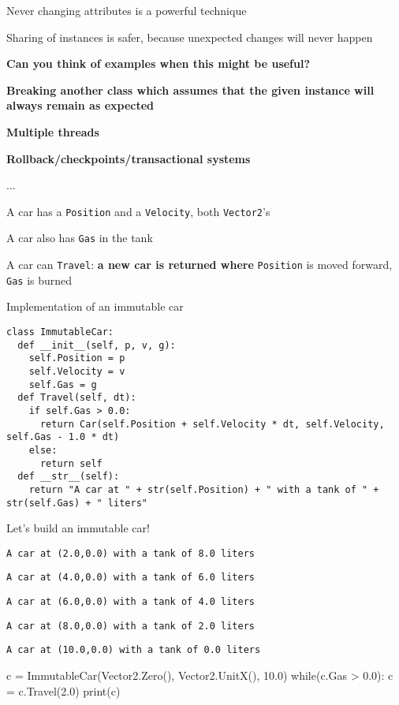 \documentclass{beamer}
\begin{document}
\begin{slide}{
\item Never changing attributes is a powerful technique
\item Sharing of instances is safer, because unexpected changes will never happen
\item \textbf{Can you think of examples when this might be useful?}
\pause
\item \textbf{Breaking another class which assumes that the given instance will always remain as expected}
\item \textbf{Multiple threads}
\item \textbf{Rollback/checkpoints/transactional systems}
\item ...
}\end{slide}

\begin{slide}{
\item A car has a \texttt{Position} and a \texttt{Velocity}, both \texttt{Vector2}'s
\item A car also has \texttt{Gas} in the tank
\item A car can \texttt{Travel}: \textbf{a new car is returned where} \texttt{Position} is moved forward, \texttt{Gas} is burned
}\end{slide}

\begin{frame}[fragile]{Implementation of an immutable car}
\begin{lstlisting}
class ImmutableCar:
  def __init__(self, p, v, g):
    self.Position = p
    self.Velocity = v
    self.Gas = g
  def Travel(self, dt):
    if self.Gas > 0.0:
      return Car(self.Position + self.Velocity * dt, self.Velocity, self.Gas - 1.0 * dt)
    else:
      return self
  def __str__(self):
    return "A car at " + str(self.Position) + " with a tank of " + str(self.Gas) + " liters"
\end{lstlisting}
\end{frame}

\begin{frame}[fragile]{Let's build an immutable car!}
\begin{codewithblock}{\pause \item \texttt{A car at (2.0,0.0) with a tank of 8.0 liters} \item \texttt{A car at (4.0,0.0) with a tank of 6.0 liters} \item \texttt{A car at (6.0,0.0) with a tank of 4.0 liters} \item \texttt{A car at (8.0,0.0) with a tank of 2.0 liters} \item \texttt{A car at (10.0,0.0) with a tank of 0.0 liters}}
c = ImmutableCar(Vector2.Zero(), Vector2.UnitX(), 10.0)
while(c.Gas > 0.0):
  c = c.Travel(2.0)
  print(c)
\end{codewithblock}
\end{frame}
\end{document}
